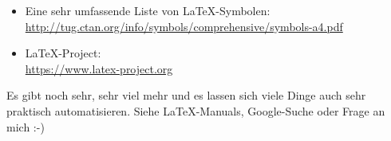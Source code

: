 \begin{itemize}
	\item Eine sehr umfassende Liste von LaTeX-Symbolen: \\
		\href{http://tug.ctan.org/info/symbols/comprehensive/symbols-a4.pdf}{http://tug.ctan.org/info/symbols/comprehensive/symbols-a4.pdf}
	\item LaTeX-Project: \\
		\href{https://www.latex-project.org}{https://www.latex-project.org}
\end{itemize}	
		
Es gibt noch sehr, sehr viel mehr und es lassen sich viele Dinge auch sehr praktisch automatisieren. Siehe LaTeX-Manuals, Google-Suche oder Frage an mich :-)
